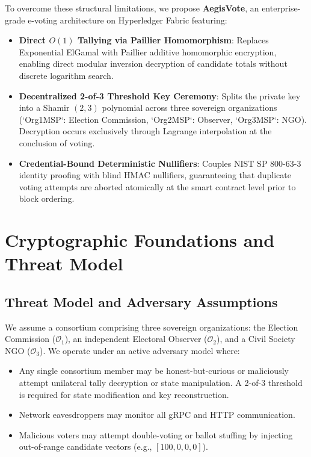 \documentclass[journal,10pt,twocolumn]{IEEEtran}
\begin{document}
To overcome these structural limitations, we propose \textbf{AegisVote}, an enterprise-grade e-voting architecture on Hyperledger Fabric featuring:
\begin{itemize}
    \item \textbf{Direct $O(1)$ Tallying via Paillier Homomorphism}: Replaces Exponential ElGamal with Paillier additive homomorphic encryption, enabling direct modular inversion decryption of candidate totals without discrete logarithm search.
    \item \textbf{Decentralized 2-of-3 Threshold Key Ceremony}: Splits the private key into a Shamir $(2, 3)$ polynomial across three sovereign organizations (`Org1MSP`: Election Commission, `Org2MSP`: Observer, `Org3MSP`: NGO). Decryption occurs exclusively through Lagrange interpolation at the conclusion of voting.
    \item \textbf{Credential-Bound Deterministic Nullifiers}: Couples NIST SP 800-63-3 identity proofing with blind HMAC nullifiers, guaranteeing that duplicate voting attempts are aborted atomically at the smart contract level prior to block ordering.
\end{itemize}

\section{Cryptographic Foundations and Threat Model}

\subsection{Threat Model and Adversary Assumptions}
We assume a consortium comprising three sovereign organizations: the Election Commission ($\mathcal{O}_1$), an independent Electoral Observer ($\mathcal{O}_2$), and a Civil Society NGO ($\mathcal{O}_3$). We operate under an active adversary model where:
\begin{itemize}
    \item Any single consortium member may be honest-but-curious or maliciously attempt unilateral tally decryption or state manipulation. A 2-of-3 threshold is required for state modification and key reconstruction.
    \item Network eavesdroppers may monitor all gRPC and HTTP communication.
    \item Malicious voters may attempt double-voting or ballot stuffing by injecting out-of-range candidate vectors (e.g., $[100, 0, 0, 0]$).
\end{itemize}
\end{document}
